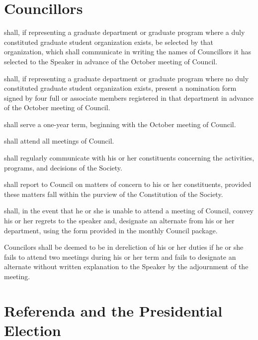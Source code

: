 \section{Councillors}
\begin{longenum}[ label*=\thesection.\arabic*., align=left]
	\item shall, if representing a graduate department or graduate program where a duly constituted graduate student organization exists, be selected by that organization, which shall communicate in writing the names of Councillors it has selected to the Speaker in advance of the October meeting of Council. 
    \item shall, if representing a graduate department or graduate program where no duly constituted graduate student organization  exists, present a nomination form signed by four full or associate members registered in that department in advance of the October meeting of Council. 
    \item shall serve a one-year term, beginning with the October meeting of Council. 
    \item shall attend all meetings of Council.
    \item shall regularly communicate with his or her constituents concerning the activities, programs, and decisions of the Society. 
    \item shall report to Council on matters of concern to his or her constituents, provided these matters fall within the purview of the Constitution of the Society. 
    \item shall, in the event that he or she is unable to attend a meeting of Council, convey his or her regrets to the speaker and, designate an alternate from his or her department, using the form provided in the monthly Council package.
    \item Councilors shall be deemed to be in dereliction of his or her duties if he or she fails to attend two meetings during his or her term and fails to designate an alternate without written explanation to the Speaker by the adjournment  of the meeting. 
\end{longenum}
\newpage
\section{Referenda and the Presidential Election}
 

